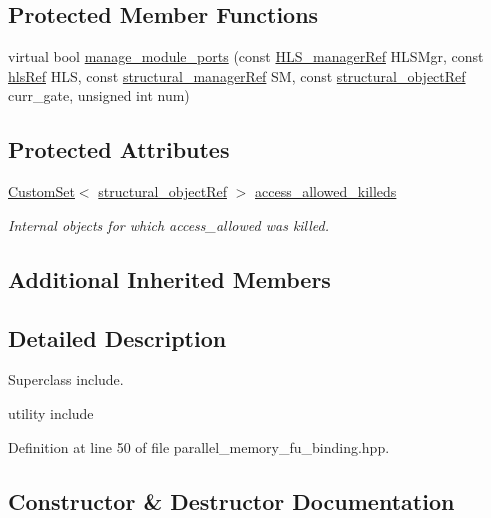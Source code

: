 \subsection*{Protected Member Functions}
\begin{DoxyCompactItemize}
\item 
virtual bool \hyperlink{classParallelMemoryFuBinding_a1e98fb5e73a6fb77e0b26e4bdf5d3ba3}{manage\+\_\+module\+\_\+ports} (const \hyperlink{hls__manager_8hpp_acd3842b8589fe52c08fc0b2fcc813bfe}{H\+L\+S\+\_\+manager\+Ref} H\+L\+S\+Mgr, const \hyperlink{hls_8hpp_a75d0c73923d0ddfa28c4843a802c73a7}{hls\+Ref} H\+LS, const \hyperlink{structural__manager_8hpp_ab3136f0e785d8535f8d252a7b53db5b5}{structural\+\_\+manager\+Ref} SM, const \hyperlink{structural__objects_8hpp_a8ea5f8cc50ab8f4c31e2751074ff60b2}{structural\+\_\+object\+Ref} curr\+\_\+gate, unsigned int num)
\end{DoxyCompactItemize}
\subsection*{Protected Attributes}
\begin{DoxyCompactItemize}
\item 
\hyperlink{custom__set_8hpp_a615bc2f42fc38a4bb1790d12c759e86f}{Custom\+Set}$<$ \hyperlink{structural__objects_8hpp_a8ea5f8cc50ab8f4c31e2751074ff60b2}{structural\+\_\+object\+Ref} $>$ \hyperlink{classParallelMemoryFuBinding_aeb2e85b1a78a4cc44ca38dbd2c9167ae}{access\+\_\+allowed\+\_\+killeds}
\begin{DoxyCompactList}\small\item\em Internal objects for which access\+\_\+allowed was killed. \end{DoxyCompactList}\end{DoxyCompactItemize}
\subsection*{Additional Inherited Members}


\subsection{Detailed Description}
Superclass include. 

utility include 

Definition at line 50 of file parallel\+\_\+memory\+\_\+fu\+\_\+binding.\+hpp.



\subsection{Constructor \& Destructor Documentation}
\mbox{\label{classParallelMemoryFuBinding_a2e94bdeebfa78cd2cd61c5f80fdeb3f2}} 
